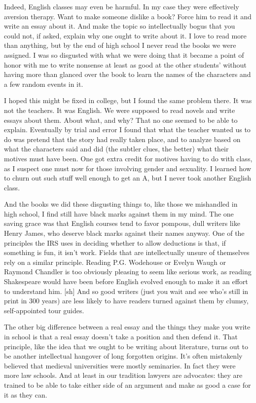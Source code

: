 Indeed, English classes may even be harmful. In my case they were
effectively aversion therapy. Want to make someone dislike a book? Force
him to read it and write an essay about it. And make the topic so
intellectually bogus that you could not, if asked, explain why one ought
to write about it. I love to read more than anything, but by the end of
high school I never read the books we were assigned. I was so disgusted
with what we were doing that it became a point of honor with me to write
nonsense at least as good at the other students' without having more
than glanced over the book to learn the names of the characters and a
few random events in it.

I hoped this might be fixed in college, but I found the same problem
there. It was not the teachers. It was English. We were supposed to read
novels and write essays about them. About what, and why? That no one
seemed to be able to explain. Eventually by trial and error I found that
what the teacher wanted us to do was pretend that the story had really
taken place, and to analyze based on what the characters said and did
(the subtler clues, the better) what their motives must have been. One
got extra credit for motives having to do with class, as I suspect one
must now for those involving gender and sexuality. I learned how to
churn out such stuff well enough to get an A, but I never took another
English class.

And the books we did these disgusting things to, like those we
mishandled in high school, I find still have black marks against them in
my mind. The one saving grace was that English courses tend to favor
pompous, dull writers like Henry James, who deserve black marks against
their names anyway. One of the principles the IRS uses in deciding
whether to allow deductions is that, if something is fun, it isn't work.
Fields that are intellectually unsure of themselves rely on a similar
principle. Reading P.G. Wodehouse or Evelyn Waugh or Raymond Chandler is
too obviously pleasing to seem like serious work, as reading Shakespeare
would have been before English evolved enough to make it an effort to
understand him. {[}sh{]} And so good writers (just you wait and see
who's still in print in 300 years) are less likely to have readers
turned against them by clumsy, self-appointed tour guides.

The other big difference between a real essay and the things they make
you write in school is that a real essay doesn't take a position and
then defend it. That principle, like the idea that we ought to be
writing about literature, turns out to be another intellectual hangover
of long forgotten origins. It's often mistakenly believed that medieval
universities were mostly seminaries. In fact they were more law schools.
And at least in our tradition lawyers are advocates: they are trained to
be able to take either side of an argument and make as good a case for
it as they can.

